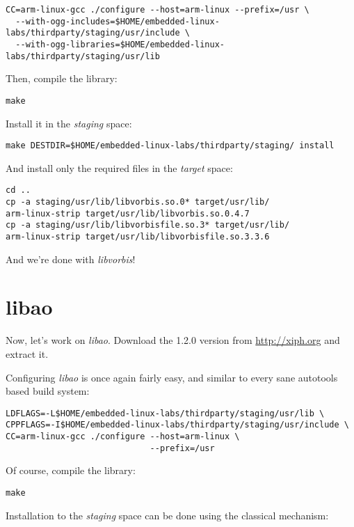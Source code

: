 \begin{verbatim}
CC=arm-linux-gcc ./configure --host=arm-linux --prefix=/usr \
  --with-ogg-includes=$HOME/embedded-linux-labs/thirdparty/staging/usr/include \
  --with-ogg-libraries=$HOME/embedded-linux-labs/thirdparty/staging/usr/lib
\end{verbatim}

Then, compile the library:

\begin{verbatim}
make
\end{verbatim}

Install it in the {\em staging} space:

\begin{verbatim}
make DESTDIR=$HOME/embedded-linux-labs/thirdparty/staging/ install
\end{verbatim}

And install only the required files in the {\em target} space:

\begin{verbatim}
cd ..
cp -a staging/usr/lib/libvorbis.so.0* target/usr/lib/
arm-linux-strip target/usr/lib/libvorbis.so.0.4.7
cp -a staging/usr/lib/libvorbisfile.so.3* target/usr/lib/
arm-linux-strip target/usr/lib/libvorbisfile.so.3.3.6
\end{verbatim}

And we're done with {\em libvorbis}!

\section{libao}

Now, let's work on {\em libao}. Download the 1.2.0 version from
\url{http://xiph.org} and extract it.

Configuring {\em libao} is once again fairly easy, and similar to
every sane autotools based build system:

\begin{verbatim}
LDFLAGS=-L$HOME/embedded-linux-labs/thirdparty/staging/usr/lib \
CPPFLAGS=-I$HOME/embedded-linux-labs/thirdparty/staging/usr/include \
CC=arm-linux-gcc ./configure --host=arm-linux \
                             --prefix=/usr
\end{verbatim}

Of course, compile the library:

\begin{verbatim}
make
\end{verbatim}

Installation to the {\em staging} space can be done using the
classical  mechanism:

